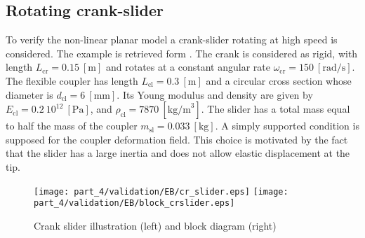 \subsection{Rotating crank-slider}
To verify the non-linear planar model a crank-slider rotating at high speed is considered. The example is retrieved form \cite{ellenbroek2018}.  The crank is considered as rigid, with length $L_{\text{cr}} = 0.15 \ [\mathrm{m}]$ and rotates at a constant angular rate $\omega_{\text{cr}} = 150 \ [\mathrm{rad/s}]$. The flexible coupler has length $L_{\text{cl}} = 0.3 \ [\mathrm{m}]$ and a circular cross section whose diameter is $d_{\text{cl}} = 6 \ [\mathrm{mm}]$. Its Young modulus and density are given by $E_{\text{cl}}=0.2 \ 10^{12} \ [\mathrm{Pa}]$, and $\rho_{\text{cl}}=7870 \ [\mathrm{kg/m}^3]$. The slider has a total mass equal to half the mass of the coupler $m_{\text{sl}} = 0.033 \ [\mathrm{kg}]$. A simply supported condition is supposed for the coupler deformation field. This choice is motivated by the fact that the slider has a large inertia and does not allow elastic displacement at the tip.

\begin{figure}[tb]
	\centering
	\texttt{[image: part\_4/validation/EB/cr\_slider.eps]} 
	\texttt{[image: part\_4/validation/EB/block\_crslider.eps]} 
	\caption{Crank slider illustration (left) and block diagram (right)}
	\label{fig:crsl}
\end{figure}

